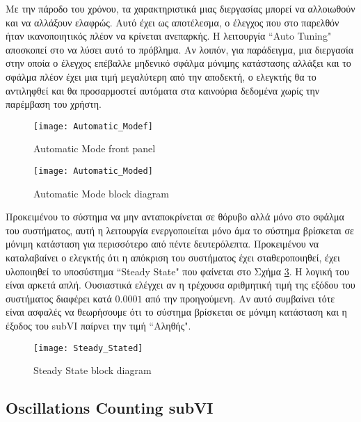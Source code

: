Με την πάροδο του χρόνου, τα χαρακτηριστικά μιας διεργασίας μπορεί να αλλοιωθούν και να αλλάξουν ελαφρώς. Αυτό έχει ως αποτέλεσμα, ο έλεγχος που στο παρελθόν ήταν ικανοποιητικός πλέον να κρίνεται ανεπαρκής. Η λειτουργία ``Auto Tuning" αποσκοπεί στο να λύσει αυτό το πρόβλημα. Αν λοιπόν, για παράδειγμα, μια διεργασία στην οποία ο έλεγχος επέβαλλε μηδενικό σφάλμα μόνιμης κατάστασης αλλάξει και το σφάλμα πλέον έχει μια τιμή μεγαλύτερη από την αποδεκτή, ο ελεγκτής θα το αντιληφθεί και θα προσαρμοστεί αυτόματα στα καινούρια δεδομένα χωρίς την παρέμβαση του χρήστη.

\begin{figure}[h]
  \centering
  \texttt{[image: Automatic\_Modef]}
  \caption{Automatic Mode front panel}
  \label{fig:Automatic_Modef}
\end{figure}

\begin{figure}[h]
  \centering
  \texttt{[image: Automatic\_Moded]}
  \caption{Automatic Mode block diagram}
  \label{fig:Automatic_Moded}
\end{figure}

Προκειμένου το σύστημα να μην ανταποκρίνεται σε θόρυβο αλλά μόνο στο σφάλμα του συστήματος, αυτή η λειτουργία ενεργοποιείται μόνο άμα το σύστημα βρίσκεται σε μόνιμη κατάσταση για περισσότερο από πέντε δευτερόλεπτα. Προκειμένου να καταλαβαίνει ο ελεγκτής ότι η απόκριση του συστήματος έχει σταθεροποιηθεί, έχει υλοποιηθεί το υποσύστημα ``Steady State" που φαίνεται στο Σχήμα \ref{fig:Steady_Stated}. Η λογική του είναι αρκετά απλή. Ουσιαστικά ελέγχει αν η τρέχουσα αριθμητική τιμή της εξόδου του συστήματος διαφέρει κατά $0.0001$ από την προηγούμενη. Αν αυτό συμβαίνει τότε είναι ασφαλές να θεωρήσουμε ότι το σύστημα βρίσκεται σε μόνιμη κατάσταση και η έξοδος του subVI παίρνει την τιμή ``Αληθής". 

\begin{figure}[h]
  \centering
  \texttt{[image: Steady\_Stated]}
  \caption{Steady State block diagram}
  \label{fig:Steady_Stated}
\end{figure}

\subsection{Oscillations Counting subVI}

